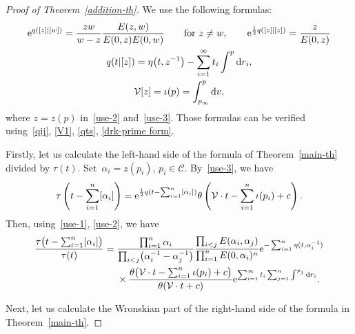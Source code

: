 \documentclass[pdftex]{sigma}
\numberwithin{equation}{section}
\theoremstyle{definition}
\begin{document}
\begin{proof}[Proof of Theorem~\ref{addition-th}]
We use the following formulas:
\begin{gather}
{\rm e}^{q([z]|[w])}=\frac{zw}{w-z}\frac{E(z,w)}{E(0,z)E(0,w)} \qquad \text{for $z\neq w$},
\qquad
{\rm e}^{\frac{1}{2}q([z]|[z])}=\frac{z}{E(0,z)}
\label{use-1}
\\
q(t|[z])=\eta\bigl(t,z^{-1}\bigr)-\sum_{i=1}^\infty t_i\int^p {\rm d}r_i,
\label{use-2}
\\
{\mathcal V}[z]=\iota(p)=\int_{p_\infty}^p {\rm d}v,
\label{use-3}
\end{gather}
where $z=z(p)$ in~\eqref{use-2} and~\eqref{use-3}.
Those formulas can be verified using~\eqref{qij}, \eqref{V1}, \eqref{qts}, \eqref{drk-prime form}.

Firstly, let us calculate the left-hand side of the formula of Theorem~\ref{main-th} divided by
$\tau(t)$.
Set~${\alpha_i=z(p_i)}$, $p_i\in {\mathcal C}$. By~\eqref{use-3}, we have
\begin{gather*}
\tau\left(t-\sum_{i=1}^n[\alpha_i]\right)
={\rm e}^{\frac{1}{2}q(t-\sum_{i=1}^n[\alpha_i])}\theta\left({\mathcal V}\cdot t-\sum_{i=1}^n\iota(p_i)+c\right).
\end{gather*}
Then, using~\eqref{use-1}, \eqref{use-2}, we have
\begin{align}
\frac{\tau\bigl(t-\sum_{i=1}^n[\alpha_i]\bigr)}{\tau(t)}
={}&
\frac{\prod_{i=1}^n\alpha_i}{\prod_{i<j}\bigl(\alpha_i^{-1}-\alpha_j^{-1}\bigr)}
\frac{\prod_{i<j}E(\alpha_i,\alpha_j)}{\prod_{i=1}^nE(0,\alpha_i)^n}
{\rm e}^{-\sum_{i=1}^n\eta(t,\alpha_i^{-1})}
\nonumber
\\
&
\times
\frac{\theta\bigl({\mathcal V}\cdot t-\sum_{i=1}^n \iota(p_i)+c\bigr)}{\theta({\mathcal V}\cdot t+c)}
{\rm e}^{\sum_{i=1}^\infty t_i\sum_{j=1}^n \int^{p_j} {\rm d}r_i}.
\label{LHS}
\end{align}

Next, let us calculate the Wronskian part of the right-hand side of the formula
in Theorem~\ref{main-th}.


\end{proof}
\end{document}
